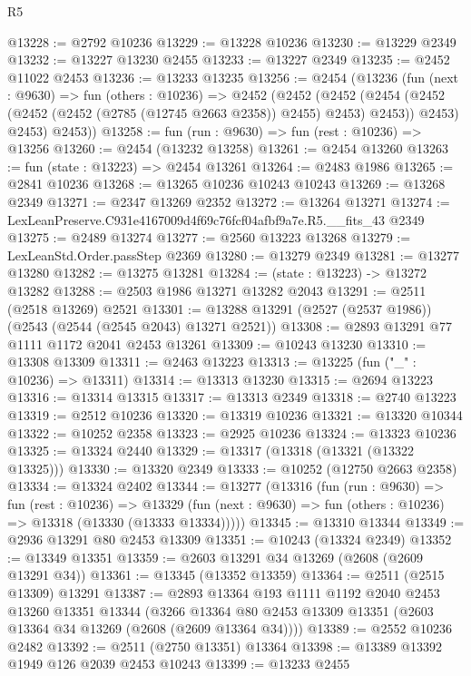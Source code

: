 \begin{lexlean}{R5}
\begin{coremodule}
@13228 := @2792 @10236
@13229 := @13228 @10236
@13230 := @13229 @2349
@13232 := @13227 @13230 @2455
@13233 := @13227 @2349
@13235 := @2452 @11022 @2453
@13236 := @13233 @13235
@13256 := @2454
    (@13236
      (fun (next : @9630) =>
      fun (others : @10236) =>
      @2452
        (@2452
          (@2452
            (@2454 (@2452 (@2452 (@2452 (@2785 (@12745 @2663 @2358)) @2455) @2453) @2453))
            @2453)
          @2453)
        @2453))
@13258 := fun (run : @9630) => fun (rest : @10236) => @13256
@13260 := @2454 (@13232 @13258)
@13261 := @2454 @13260
@13263 := fun (state : @13223) => @2454 @13261
@13264 := @2483 @1986
@13265 := @2841 @10236
@13268 := @13265 @10236 @10243 @10243
@13269 := @13268 @2349
@13271 := @2347 @13269 @2352
@13272 := @13264 @13271
@13274 := LexLeanPreserve.C931e4167009d4f69c76fcf04afbf9a7e.R5.__fits_43 @2349
@13275 := @2489 @13274
@13277 := @2560 @13223 @13268
@13279 := LexLeanStd.Order.passStep @2369
@13280 := @13279 @2349
@13281 := @13277 @13280
@13282 := @13275 @13281
@13284 := (state : @13223) -> @13272 @13282
@13288 := @2503 @1986 @13271 @13282 @2043
@13291 := @2511 (@2518 @13269) @2521
@13301 := @13288 @13291 (@2527 (@2537 @1986)) (@2543 (@2544 (@2545 @2043) @13271 @2521))
@13308 := @2893 @13291 @77 @1111 @1172 @2041 @2453 @13261
@13309 := @10243 @13230
@13310 := @13308 @13309
@13311 := @2463 @13223
@13313 := @13225 (fun ("_" : @10236) => @13311)
@13314 := @13313 @13230
@13315 := @2694 @13223
@13316 := @13314 @13315
@13317 := @13313 @2349
@13318 := @2740 @13223
@13319 := @2512 @10236
@13320 := @13319 @10236
@13321 := @13320 @10344
@13322 := @10252 @2358
@13323 := @2925 @10236
@13324 := @13323 @10236
@13325 := @13324 @2440
@13329 := @13317 (@13318 (@13321 (@13322 @13325)))
@13330 := @13320 @2349
@13333 := @10252 (@12750 @2663 @2358)
@13334 := @13324 @2402
@13344 := @13277
    (@13316
      (fun (run : @9630) =>
      fun (rest : @10236) =>
      @13329 (fun (next : @9630) => fun (others : @10236) => @13318 (@13330 (@13333 @13334)))))
@13345 := @13310 @13344
@13349 := @2936 @13291 @80 @2453 @13309
@13351 := @10243 (@13324 @2349)
@13352 := @13349 @13351
@13359 := @2603 @13291 @34 @13269 (@2608 (@2609 @13291 @34))
@13361 := @13345 (@13352 @13359)
@13364 := @2511 (@2515 @13309) @13291
@13387 := @2893
    @13364
    @193
    @1111
    @1192
    @2040
    @2453
    @13260
    @13351
    @13344
    (@3266 @13364 @80 @2453 @13309 @13351 (@2603 @13364 @34 @13269 (@2608 (@2609 @13364 @34))))
@13389 := @2552 @10236 @2482
@13392 := @2511 (@2750 @13351) @13364
@13398 := @13389 @13392 @1949 @126 @2039 @2453 @10243
@13399 := @13233 @2455

\end{coremodule}
\end{lexlean}
